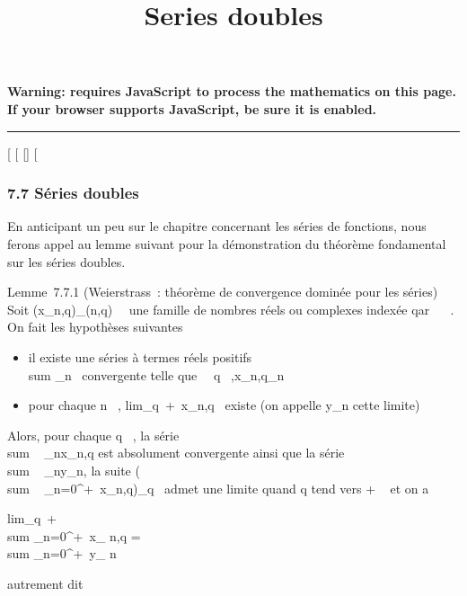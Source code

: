 \documentclass[]{article}
\title{Series doubles}
\author{}
\date{}
\begin{document}
\maketitle

\textbf{Warning: 
requires JavaScript to process the mathematics on this page.\\ If your
browser supports JavaScript, be sure it is enabled.}

\begin{center}\rule{3in}{0.4pt}\end{center}

{[}
{[}
{[}{]}
{[}

\subsubsection{7.7 Séries doubles}

En anticipant un peu sur le chapitre concernant les séries de fonctions,
nous ferons appel au lemme suivant pour la démonstration du théorème
fondamental sur les séries doubles.

Lemme~7.7.1 (Weierstrass~: théorème de convergence dominée pour les
séries) Soit (x_n,q)_(n,q)\in{}~\times{}~ une famille de nombres
réels ou complexes indexée qar ~ \times {}~. On fait les hypothèses suivantes

\begin{itemize}
\itemsep1pt\parskip0pt
\item
  il existe une séries à termes réels positifs
  \\sum  \alpha_n~
  convergente telle que \forall~~q \in
  ~,x_n,q\leq \alpha_n
\item
  pour chaque n \in {}~,
  lim_q\rightarrow~+\infty~x_n,q~ existe (on
  appelle y_n cette limite)
\end{itemize}

Alors, pour chaque q \in {}~, la série
\\sum ~
_nx_n,q est absolument convergente ainsi que la série
\\sum ~
_ny_n, la suite \left
(\\sum ~
_n=0^+\infty~x_n,q\right )_q\in{}~
admet une limite quand q tend vers + \infty~ et on a

lim_q\rightarrow~+\infty~~\\sum
_n=0^+\infty~x_ n,q = \\sum
_n=0^+\infty~y_ n

autrement dit
\end{document}
